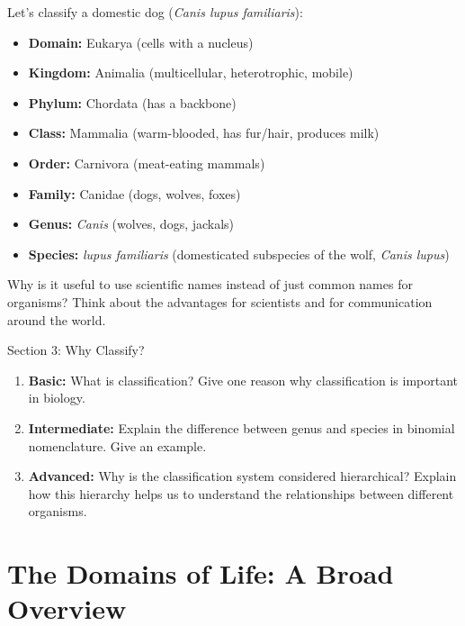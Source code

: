 \begin{example}
Let's classify a domestic dog (\textit{Canis lupus familiaris}):

\begin{itemize}
    \item \textbf{Domain:} Eukarya (cells with a nucleus)
    \item \textbf{Kingdom:} Animalia (multicellular, heterotrophic, mobile)
    \item \textbf{Phylum:} Chordata (has a backbone)
    \item \textbf{Class:} Mammalia (warm-blooded, has fur/hair, produces milk)
    \item \textbf{Order:} Carnivora (meat-eating mammals)
    \item \textbf{Family:} Canidae (dogs, wolves, foxes)
    \item \textbf{Genus:} \textit{Canis} (wolves, dogs, jackals)
    \item \textbf{Species:} \textit{lupus familiaris} (domesticated subspecies of the wolf, \textit{Canis lupus})
\end{itemize}
\end{example}

\begin{stopandthink}
Why is it useful to use scientific names instead of just common names for organisms? Think about the advantages for scientists and for communication around the world.
\end{stopandthink}


\begin{tieredquestions}{Section 3: Why Classify?}
\begin{enumerate}
    \item \textbf{Basic:} What is classification?  Give one reason why classification is important in biology.
    \item \textbf{Intermediate:} Explain the difference between genus and species in binomial nomenclature.  Give an example.
    \item \textbf{Advanced:}  Why is the classification system considered hierarchical? Explain how this hierarchy helps us to understand the relationships between different organisms.
\end{enumerate}
\end{tieredquestions}


\section{The Domains of Life: A Broad Overview}

